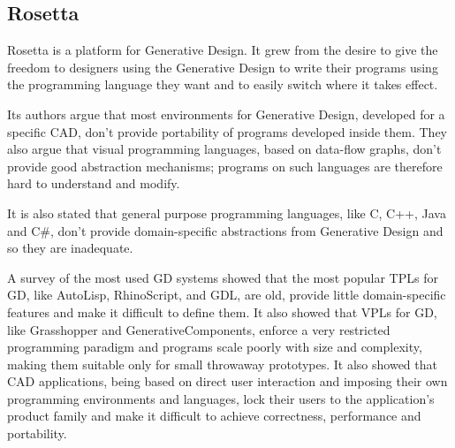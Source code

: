 \documentclass{./llncs2e/llncs}
\begin{document}

\subsection{Rosetta}
	Rosetta is a platform for Generative Design.
	It grew from the desire to give the freedom to designers using the Generative Design to write their programs using the programming language they want and to easily switch where it takes effect.

	Its authors argue that most environments for Generative Design, developed for a specific CAD, don't provide portability of programs developed inside them.
	They also argue that visual programming languages, based on data-flow graphs, don't provide good abstraction mechanisms; programs on such languages are therefore hard to understand and modify.

	It is also stated that general purpose programming languages, like C, C++, Java and C\#, don't provide domain-specific abstractions from Generative Design and so they are inadequate.

	A survey of the most used GD systems showed that the most popular TPLs for GD, like AutoLisp, RhinoScript, and GDL, are old, provide little domain-specific features and make it difficult to define them.
	It also showed that VPLs for GD, like Grasshopper and GenerativeComponents, enforce a very restricted programming paradigm and programs scale poorly with size and complexity, making them suitable only for small throwaway prototypes. 
	It also showed that CAD applications, being based on direct user interaction and imposing their own programming environments and languages, lock their users to the application's product family and make it difficult to achieve correctness, performance and portability.
\end{document}
